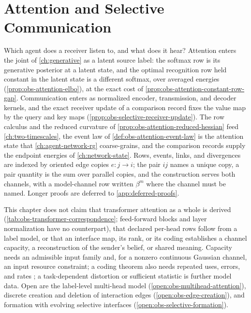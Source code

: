 \chapter{Attention and Selective Communication}
\label{ch:selective-communication}

Which agent does a receiver listen to, and what does it hear? Attention enters
the joint of \cref{ch:generative} as a latent source label: the softmax row is
its generative posterior at a latent state, and the optimal recognition row
held constant in the latent state is a different softmax, over averaged
energies (\cref{prop:obs-attention-elbo}), at the exact cost of
\cref{prop:obs-attention-constant-row-gap}. Communication enters as normalized
encoder, transmission, and decoder kernels, and the exact receiver update of a
comparison record fixes the value map by the query and key maps
(\cref{prop:obs-selective-receiver-update}). The row calculus and the reduced
curvature of \cref{prop:obs-attention-reduced-hessian} feed
\cref{ch:two-timescales}, the event law of \cref{def:obs-attention-event-law}
is the attention state that \cref{ch:agent-network-rg} coarse-grains, and the
comparison records supply the endpoint energies of \cref{ch:network-state}.
Rows, events, links, and divergences are indexed by oriented edge copies
\(e:j\to i\); the pair \(ij\) names a unique copy, a pair quantity is the sum
over parallel copies, and the construction serves both channels, with a
model-channel row written \(\beta^m\) where the channel must be named.
Longer proofs are deferred to \cref{app:deferred-proofs}.

This chapter does not claim that transformer attention as a whole is derived
(\cref{tab:obs-transformer-correspondence}; feed-forward blocks and layer
normalization have no counterpart), that declared per-head rows follow from a
label model, or that an interface map, its rank, or its coding establishes a
channel capacity, a reconstruction of the sender's belief, or shared meaning.
Capacity needs an admissible input family and, for a nonzero continuous
Gaussian channel, an input resource constraint; a coding theorem also needs
repeated uses, errors, and rates \citep{Shannon1948}; a task-dependent
distortion or sufficient statistic is further model data. Open are the
label-level multi-head model (\cref{open:obs-multihead-attention}), discrete
creation and deletion of interaction edges (\cref{open:obs-edge-creation}), and
formation with evolving selective interfaces
(\cref{open:obs-selective-formation}).

